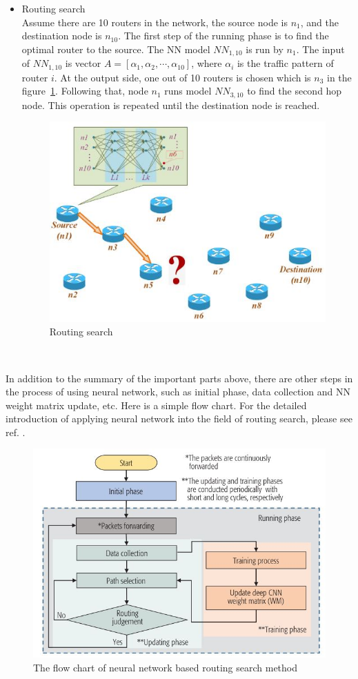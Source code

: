 \documentclass[11pt]{report}
\begin{document}
	\begin{itemize}
		\item Routing search\\
		Assume there are 10 routers in the network, the source node is $n_1$, and the destination node is $n_10$. The first step of the running phase is to find the optimal router to the source. The NN model $NN_{1,10}$ is run by $n_1$. The input of $NN_{1,10}$ is vector $A=\left[\alpha_1, \alpha_2,\cdots, \alpha_10\right]$, where $\alpha_i$ is the traffic pattern of router $i$. At the output side, one out of 10 routers is chosen which is $n_3$ in the figure~\ref{4thfig}. Following that, node $n_1$ runs model $NN_{3,10}$ to find the second hop node. This operation is repeated until the destination node is reached.\\
		\begin{figure}[h!]
			\centering
			\includegraphics[width=0.6\linewidth]{figure6.jpg}
			\caption{Routing search}
			\label{4thfig}
		\end{figure}\\ 
	\end{itemize}
        
    \noindent In addition to the summary of the important parts above, there are other steps in the process of using neural network, such as initial phase, data collection and NN weight matrix update, etc. Here is a simple flow chart. For the detailed introduction of applying neural network into the field of routing search, please see ref. \cite{7792369}.
    \begin{figure}[h!]
    	\centering
    	\includegraphics[width=0.6\linewidth]{figure7.jpg}
    	\caption{The flow chart of neural network based routing search method}
    	\label{5thfig}   
    \end{figure}\\ 
    
\end{document}
